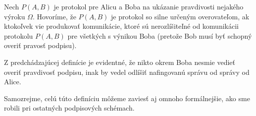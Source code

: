 \begin{definicia}
    Nech $P(A,B)$ je protokol pre Alicu a Boba na ukázanie pravdivosti
    nejakého výroku $\Omega$. Hovoríme, že $P(A,B)$ je protokol so
    silne určeným overovateľom, ak ktokoľvek vie produkovať
    komunikácie, ktoré sú nerozlíšiteľné od komunikácii protokolu
    $P(A,B)$ pre všetkých s výnikou Boba (pretože Bob musí byť schopný
    overiť pravosť podpisu). 
\end{definicia}

\begin{poznamka}
    Z predchádzajúcej definície je evidentné, že nikto okrem Boba nesmie
    vedieť overiť pravdivosť podpisu,
    inak by vedel odlíšiť nafingovanú správu od správy od Alice.
\end{poznamka}

Samozrejme, celú túto definíciu môžeme zaviesť aj omnoho formálnejšie,
ako sme robili pri ostatných podpisových schémach.

